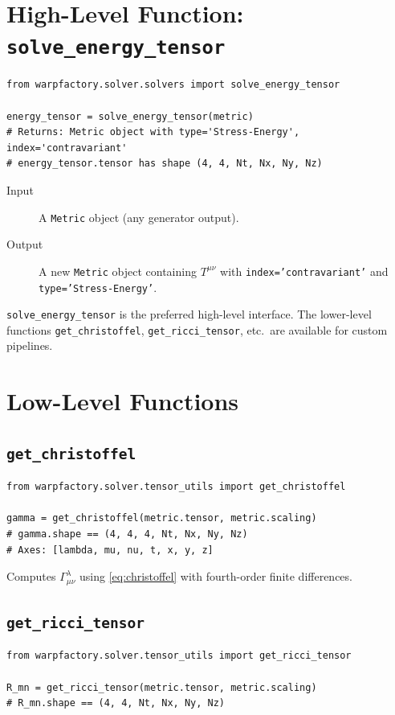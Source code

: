 \documentclass[11pt, a4paper, twoside]{report}
\begin{document}
\section{High-Level Function: \texttt{solve\_energy\_tensor}}

\begin{lstlisting}[caption={Full Einstein pipeline}]
from warpfactory.solver.solvers import solve_energy_tensor

energy_tensor = solve_energy_tensor(metric)
# Returns: Metric object with type='Stress-Energy', index='contravariant'
# energy_tensor.tensor has shape (4, 4, Nt, Nx, Ny, Nz)
\end{lstlisting}

\begin{description}
  \item[Input] A \texttt{Metric} object (any generator output).
  \item[Output] A new \texttt{Metric} object containing $T^{\mu\nu}$
        with \texttt{index='contravariant'} and
        \texttt{type='Stress-Energy'}.
\end{description}

\begin{infobox}
\texttt{solve\_energy\_tensor} is the preferred high-level interface.
The lower-level functions \texttt{get\_christoffel}, \texttt{get\_ricci\_tensor},
etc.\ are available for custom pipelines.
\end{infobox}

\section{Low-Level Functions}

\subsection{\texttt{get\_christoffel}}
\begin{lstlisting}
from warpfactory.solver.tensor_utils import get_christoffel

gamma = get_christoffel(metric.tensor, metric.scaling)
# gamma.shape == (4, 4, 4, Nt, Nx, Ny, Nz)
# Axes: [lambda, mu, nu, t, x, y, z]
\end{lstlisting}
Computes $\varGamma^\lambda_{\mu\nu}$ using \cref{eq:christoffel} with
fourth-order finite differences.

\subsection{\texttt{get\_ricci\_tensor}}
\begin{lstlisting}
from warpfactory.solver.tensor_utils import get_ricci_tensor

R_mn = get_ricci_tensor(metric.tensor, metric.scaling)
# R_mn.shape == (4, 4, Nt, Nx, Ny, Nz)
\end{lstlisting}
\end{document}
